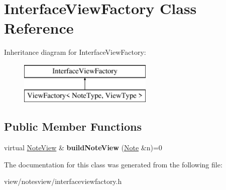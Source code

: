 \hypertarget{class_interface_view_factory}{\section{Interface\-View\-Factory Class Reference}
\label{class_interface_view_factory}
}
Inheritance diagram for Interface\-View\-Factory\-:\begin{figure}[H]
\begin{center}
\leavevmode
\includegraphics[height=2.000000cm]{class_interface_view_factory}
\end{center}
\end{figure}
\subsection*{Public Member Functions}
\begin{DoxyCompactItemize}
\item 
\hypertarget{class_interface_view_factory_aeedd128d47f2650a3b5a05c9f34e6bb3}{virtual \hyperlink{class_note_view}{Note\-View} \& {\bfseries build\-Note\-View} (\hyperlink{class_note}{Note} \&n)=0}\label{class_interface_view_factory_aeedd128d47f2650a3b5a05c9f34e6bb3}

\end{DoxyCompactItemize}


The documentation for this class was generated from the following file\-:\begin{DoxyCompactItemize}
\item 
view/notesview/interfaceviewfactory.\-h\end{DoxyCompactItemize}
